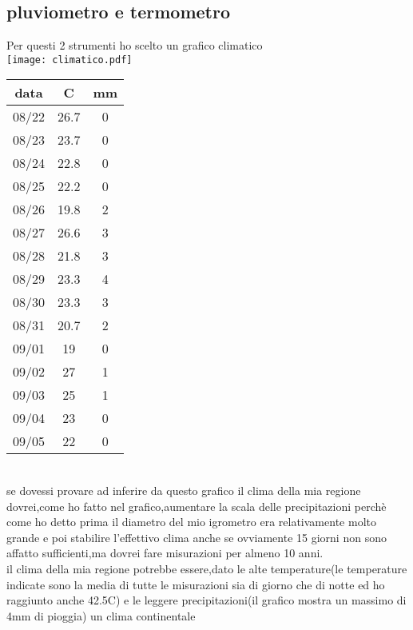\documentclass[12pt]{article}
\begin{document}
\subsection{pluviometro e termometro}
Per questi 2 strumenti ho scelto un grafico climatico\\
\texttt{[image: climatico.pdf]} \\
\begin{tabular}{|c|c|c|}
    \hline
    data & C & mm \\
    \hline
     08/22 &  26.7 & 0\\
     08/23 &  23.7 & 0\\
     08/24 &  22.8 & 0\\
     08/25 &  22.2 & 0\\
     08/26 &  19.8  & 2\\
     08/27 &  26.6 & 3\\
     08/28 &  21.8 & 3\\
     08/29 &  23.3 & 4\\
     08/30 &  23.3 & 3\\
     08/31 &  20.7 & 2\\
     09/01 &  19  & 0\\
     09/02 &  27 & 1\\
     09/03 &  25 & 1\\
     09/04 &  23  & 0\\
     09/05 &  22  & 0\\
     \hline
\end{tabular} \\
se dovessi provare ad inferire da questo grafico il clima della mia regione dovrei,come ho fatto nel grafico,aumentare la scala delle precipitazioni perchè come ho detto prima il diametro del mio igrometro era relativamente molto grande e poi stabilire l'effettivo clima anche se ovviamente 15 giorni non sono affatto sufficienti,ma dovrei fare misurazioni per almeno 10 anni.\\
il clima della mia regione potrebbe essere,dato le alte temperature(le temperature indicate sono la media di tutte le misurazioni sia di giorno che di notte ed ho raggiunto anche 42.5C) e le leggere precipitazioni(il grafico mostra un massimo di 4mm di pioggia) un clima continentale
\end{document}
